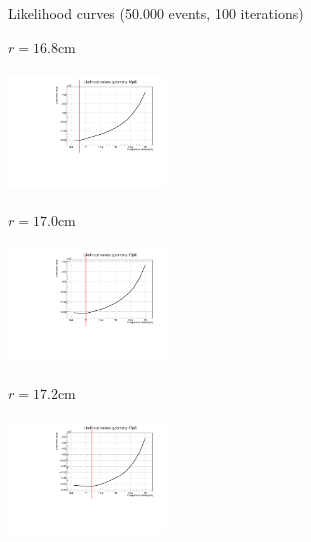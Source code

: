 \documentclass[handout,8 pt]{beamer}
\begin{document}
\begin{frame}{Likelihood curves (50.000 events, 100 iterations)}
\justifying
\begin{minipage}[c]{.32\textwidth}
\begin{exampleblock}{} \begin{center}$r = 16.8$cm\end{center} \end{exampleblock}
\includegraphics[width=4.2cm, height=3.2cm]{figs/likelihood100HighStat/likelihood16p8.pdf} 
\end{minipage}
\begin{minipage}[c]{.32\textwidth}
\begin{exampleblock}{} \begin{center}$r = 17.0$cm\end{center} \end{exampleblock}
\includegraphics[width=4.2cm, height=3.2cm]{figs/likelihood100HighStat/likelihood17p0.pdf} 
\end{minipage}
\begin{minipage}[c]{.32\textwidth}
\begin{exampleblock}{} \begin{center}$r = 17.2$cm\end{center} \end{exampleblock}
\includegraphics[width=4.2cm, height=3.2cm]{figs/likelihood100HighStat/likelihood17p2.pdf} 
\end{minipage}


\end{frame}
\end{document}
